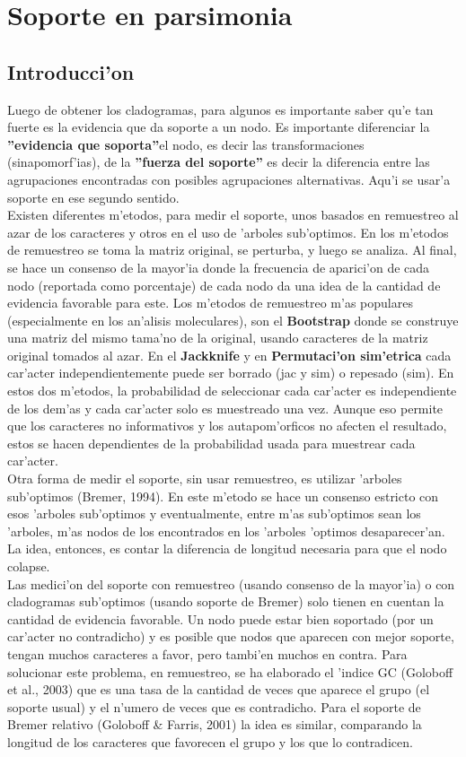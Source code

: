 \chapter{Soporte en parsimonia}
\section*{Introducci'on}
Luego de obtener los cladogramas, para algunos es importante saber qu'e tan fuerte es la evidencia que da soporte a un nodo. Es importante diferenciar la \textbf{''evidencia que soporta''}el nodo, es decir las transformaciones (sinapomorf'ias), de la \textbf{''fuerza del soporte''} es decir la diferencia entre las agrupaciones encontradas con posibles agrupaciones alternativas. Aqu'i se usar'a soporte en ese segundo sentido.\\
Existen diferentes m'etodos, para medir el soporte, unos basados en remuestreo al azar de los caracteres y otros en el uso de 'arboles sub'optimos. En los m'etodos de remuestreo se toma la matriz original, se perturba, y luego se analiza. Al final, se hace un consenso de la mayor'ia donde la frecuencia de aparici'on de cada nodo (reportada como porcentaje) de cada nodo da una idea de la cantidad de evidencia favorable para este. Los m'etodos de remuestreo m'as populares (especialmente en los an'alisis moleculares), son el \textbf{Bootstrap} donde se construye una matriz del mismo tama'no de la original, usando caracteres de la matriz original tomados al azar. En el \textbf{Jackknife} y en \textbf{Permutaci'on sim'etrica} cada car'acter independientemente puede ser borrado (jac y sim) o repesado (sim). En estos dos m'etodos, la probabilidad de seleccionar cada car'acter es independiente de los dem'as y cada car'acter solo es muestreado una vez. Aunque eso permite que los caracteres no informativos y los autapom'orficos no afecten el resultado, estos se hacen dependientes de la probabilidad usada para muestrear cada car'acter.\\
Otra forma de medir el soporte, sin usar remuestreo, es utilizar 'arboles sub'optimos (Bremer, 1994). En este m'etodo se hace un consenso estricto con esos 'arboles sub'optimos y eventualmente, entre m'as sub'optimos sean los 'arboles, m'as nodos de los encontrados en los 'arboles 'optimos desaparecer'an. La idea, entonces, es contar la diferencia de longitud necesaria para que el nodo colapse.\\
Las medici'on del soporte con remuestreo (usando consenso de la mayor'ia) o con cladogramas sub'optimos (usando soporte de Bremer) solo tienen en cuentan la cantidad de evidencia favorable. Un nodo puede estar bien soportado (por un car'acter no contradicho) y es posible que nodos que aparecen con mejor soporte, tengan muchos caracteres a favor, pero tambi'en muchos en contra. Para solucionar este problema, en remuestreo, se ha elaborado el 'indice GC (Goloboff et al., 2003) que es una tasa de la cantidad de veces que aparece el grupo (el soporte usual) y el n'umero de veces que es contradicho. Para el soporte de Bremer relativo (Goloboff \& Farris, 2001) la idea es similar, comparando la longitud de los caracteres que favorecen el grupo y los que lo contradicen.\\
